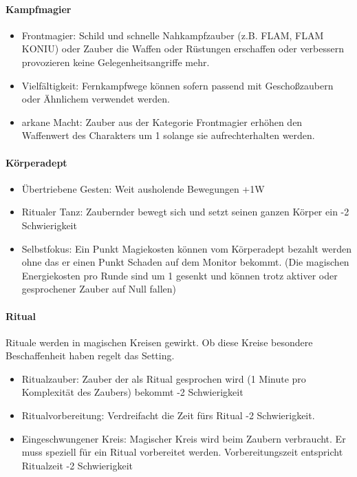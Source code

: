 \documentclass{article}
\begin{document}
\paragraph{Kampfmagier}

\begin{itemize}
\item Frontmagier: Schild und schnelle Nahkampfzauber (z.B. FLAM, FLAM KONIU) oder Zauber die Waffen oder Rüstungen erschaffen oder verbessern provozieren keine Gelegenheitsangriffe mehr.
\item Vielfältigkeit: Fernkampfwege können sofern passend mit Geschoßzaubern oder Ähnlichem verwendet werden.
\item arkane Macht: Zauber aus der Kategorie Frontmagier erhöhen den Waffenwert des Charakters um 1 solange sie aufrechterhalten werden.
\end{itemize}

\paragraph{Körperadept}

\begin{itemize}
\item Übertriebene Gesten: Weit ausholende Bewegungen +1W
\item Ritualer Tanz: Zaubernder bewegt sich und setzt seinen ganzen Körper ein -2 Schwierigkeit
\item Selbstfokus: Ein Punkt Magiekosten können vom Körperadept bezahlt werden ohne das er einen Punkt Schaden auf dem Monitor bekommt. (Die magischen Energiekosten pro Runde sind um 1 gesenkt und können trotz aktiver oder gesprochener Zauber auf Null fallen)
\end{itemize}

\paragraph{Ritual}

Rituale werden in magischen Kreisen gewirkt. Ob diese Kreise besondere Beschaffenheit haben regelt das Setting.

\begin{itemize}
\item Ritualzauber: Zauber der als Ritual gesprochen wird (1 Minute pro Komplexität des Zaubers) bekommt -2 Schwierigkeit
\item Ritualvorbereitung: Verdreifacht die Zeit fürs Ritual -2 Schwierigkeit.
\item Eingeschwungener Kreis: Magischer Kreis wird beim Zaubern verbraucht. Er muss speziell für ein Ritual vorbereitet werden. Vorbereitungszeit entspricht Ritualzeit -2 Schwierigkeit
\end{itemize}
\end{document}
